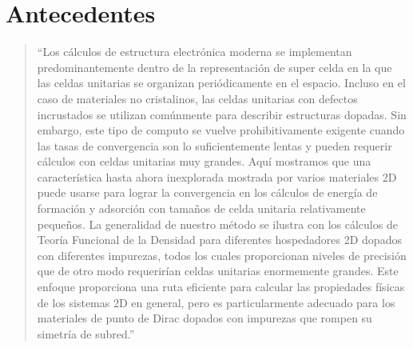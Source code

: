 \chapter{Antecedentes}

	

\blockquote[]{``Los cálculos de estructura electrónica moderna 
	se implementan predominantemente dentro de la representación de super celda en 
	la que las celdas unitarias se organizan periódicamente en el espacio. Incluso 
	en el caso de materiales no cristalinos, las celdas unitarias con defectos 
	incrustados se utilizan comúnmente para describir estructuras dopadas. Sin 
	embargo, este tipo de computo se vuelve prohibitivamente exigente cuando las 
	tasas de convergencia son lo suficientemente lentas y pueden requerir cálculos 
	con celdas unitarias muy grandes. Aquí mostramos que una característica hasta 
	ahora inexplorada mostrada por varios materiales 2D puede usarse para lograr la 
	convergencia en los cálculos de energía de formación y adsorción con tamaños de 
	celda unitaria relativamente pequeños. La generalidad de nuestro método se 
	ilustra con los cálculos de Teoría Funcional de la Densidad para diferentes 
	hospedadores 2D dopados con diferentes impurezas, todos los cuales proporcionan 
	niveles de precisión que de otro modo requerirían celdas unitarias enormemente 
	grandes. Este enfoque proporciona una ruta eficiente para calcular las 
	propiedades físicas de los sistemas 2D en general, pero es particularmente 
	adecuado para los materiales de punto de Dirac dopados con impurezas que rompen 
	su simetría de subred.''}


